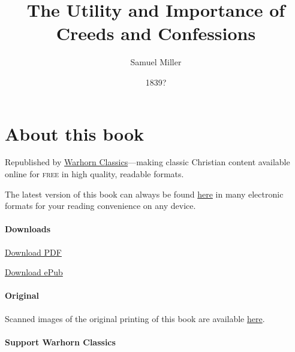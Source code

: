 \documentclass[
]{book}
\title{The Utility and Importance of Creeds and Confessions}
\author{Samuel Miller}
\date{1839?}
\begin{document}
\maketitle

\mainmatter
{}

{
\setcounter{tocdepth}{1}
\tableofcontents
}
\hypertarget{about-this-book}{%
\chapter*{About this book}\label{about-this-book}}

Republished by \href{https://classics.warhornmedia.com/}{Warhorn Classics}---making classic Christian content available online for \textsc{free} in high quality, readable formats.

The latest version of this book can always be found \href{https://warhornmedia.github.io/miller-creeds-and-confessions/}{here} in many electronic formats for your reading convenience on any device.

\hypertarget{downloads}{%
\subsubsection*{Downloads}\label{downloads}}

\href{https://warhornmedia.github.io/miller-creeds-and-confessions//Miller-Creeds_and_Confessions.pdf}{Download PDF}

\href{https://warhornmedia.github.io/miller-creeds-and-confessions//Miller-Creeds_and_Confessions.epub}{Download ePub}

\hypertarget{original}{%
\subsubsection*{Original}\label{original}}

Scanned images of the original printing of this book are available \href{https://archive.org/details/utilityimportanc00milluoft/page/n3/mode/2up}{here}.

\hypertarget{support-warhorn-classics}{%
\subsubsection*{Support Warhorn Classics}\label{support-warhorn-classics}}
\end{document}
